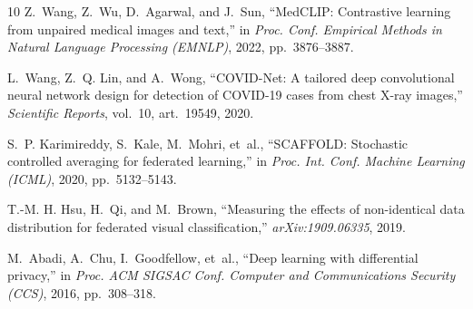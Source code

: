 \documentclass[letterpaper, conference]{IEEEtran}
\begin{document}
\begin{thebibliography}{10}
Z.~Wang, Z.~Wu, D.~Agarwal, and J.~Sun,
``MedCLIP: Contrastive learning from unpaired medical images and text,''
in \emph{Proc. Conf. Empirical Methods in Natural Language Processing (EMNLP)},
2022, pp.~3876--3887.

L.~Wang, Z.~Q. Lin, and A.~Wong,
``COVID-Net: A tailored deep convolutional neural network design for detection of
COVID-19 cases from chest X-ray images,''
\emph{Scientific Reports}, vol.~10, art.~19549, 2020.

S.~P. Karimireddy, S.~Kale, M.~Mohri, et~al.,
``SCAFFOLD: Stochastic controlled averaging for federated learning,''
in \emph{Proc. Int. Conf. Machine Learning (ICML)}, 2020, pp.~5132--5143.

T.-M. H. Hsu, H.~Qi, and M.~Brown,
``Measuring the effects of non-identical data distribution for federated visual
classification,'' \emph{arXiv:1909.06335}, 2019.

M.~Abadi, A.~Chu, I.~Goodfellow, et~al.,
``Deep learning with differential privacy,''
in \emph{Proc. ACM SIGSAC Conf. Computer and Communications Security (CCS)}, 2016,
pp.~308--318.

\end{thebibliography}
\end{document}
